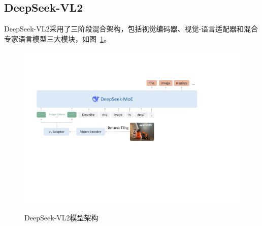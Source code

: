 \subsection{DeepSeek-VL2}

DeepSeek-VL2\cite{wuDeepSeekVL2MixtureofExpertsVisionLanguage2024}采用了三阶段混合架构，包括视觉编码器、视觉-语言适配器和混合专家语言模型三大模块，如图~\ref{fig:deepseek_vl2_structure}。
\begin{figure}[ht]
    \centering
    \includegraphics[width=1\textwidth]
    {figures/deepseek_vl2_structure.pdf}\\
    \caption{DeepSeek-VL2模型架构\cite{wuDeepSeekVL2MixtureofExpertsVisionLanguage2024}}
    \label{fig:deepseek_vl2_structure} %
\end{figure}


